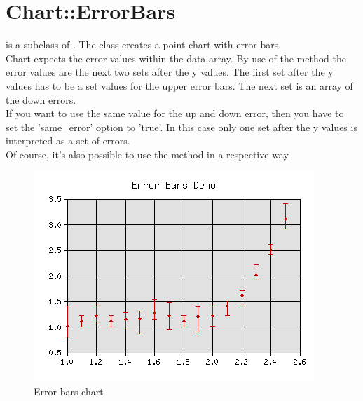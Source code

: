 %
%
\section{Chart::ErrorBars}

\begin{Description} 
 is a subclass of .
The class  creates a point chart with error bars.\\
Chart expects the error values within the data array. 
By use of the  method the error values are the next two sets after the y values. The first set after the y values has to be a set values for the upper error bars. 
The next set is an array of the down errors.\\
If you want to use the same value for the up and down error, then you have to set the 
'same\_error' option to 'true'. In this case only one set after the y values is interpreted 
as a set of errors.\\
Of course, it's also possible to use the  method in a respective way.
\end{Description}

\begin{figure}[h]
	\begin{center}
		\includegraphics[scale=0.7]{error.png}
	\end{center}
	\caption{Error bars chart}
	\label{fig:error}
\end{figure}

